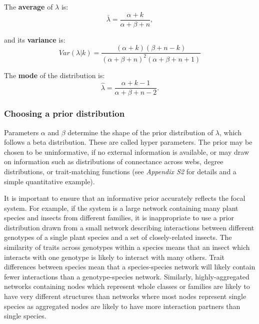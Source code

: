 \documentclass[12pt]{article}
\begin{document}
\begin{spacing}{2.0}
      The \textbf{average} of $\lambda$ is: 
          \begin{equation}
            \bar{\lambda} = \frac{\alpha+k}{\alpha+\beta+n} ,
            \label{mean}
          \end{equation}

        and its \textbf{variance} is:  
          \begin{equation}
            Var(\lambda|k) = \frac{(\alpha + k)(\beta + n - k)}{(\alpha + \beta + n)^{2}(\alpha + \beta + n +1)}
            \label{variance}
          \end{equation}

        The \textbf{mode} of the distribution is:
          \begin{equation}
            \hat{\lambda} = \frac{\alpha + k - 1}{\alpha + \beta + n - 2} .
            \label{mode}
          \end{equation}


    \subsubsection*{Choosing a prior distribution}    

      Parameters $\alpha$ and $\beta$ determine the shape of the prior distribution of $\lambda$, which follows a beta distribution. These are called hyper parameters. The prior may be chosen to be uninformative, if no external information is available, or may draw on information such as distributions of connectance across webs, degree distributions, or trait-matching functions (see \emph{Appendix S2} for details and a simple quantitative example). 


      It is important to ensure that an informative prior accurately reflects the focal  system. For example, if the system is a large network containing many plant species and insects from different families, it is inappropriate to use a prior distribution drawn from a small network describing interactions between different genotypes of a single plant species and a set of closely-related insects. The similarity of traits across genotypes within a species means that an insect which interacts with one genotype is likely to interact with many others. Trait differences between species mean that a species-species network will likely contain fewer interactions than a genotype-species network. Similarly, highly-aggregated networks containing nodes which represent whole classes or families are likely to have very different structures than networks where most nodes represent single species as aggregated nodes are likely to have more interaction partners than single species.



\end{spacing}
\end{document}
